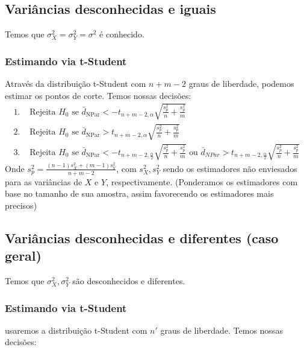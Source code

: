 \documentclass[
  letterpaper,
  DIV=11,
  numbers=noendperiod]{scrreprt}
\begin{document}
\subsection{Variâncias desconhecidas e
iguais}\label{variuxe2ncias-desconhecidas-e-iguais}

Temos que \(\sigma^2_{X}=\sigma^2_{Y}=\sigma^2\) é conhecido.

\subsubsection{Estimando via t-Student}\label{estimando-via-t-student}

Através da distribuição t-Student com \(n+m-2\) graus de liberdade,
podemos estimar os pontos de corte. Temos nossas decisões: \[
\begin{aligned}
1. &\text{ Rejeita $H_{0}$ se } \bar{d}_{\mathrm{NPar}} < -t_{n+m-2,\alpha} \sqrt{ \frac{s_{p}^2}{n} + \frac{s_{p}^2}{m} } \\
2. & \text{ Rejeita $H_{0}$ se } \bar{d}_{\mathrm{NPar}} > t_{n+m-2,\alpha} \sqrt{ \frac{s^2_{p}}{n} + \frac{s^2_{p}}{m} } \\
3. & \text{ Rejeita $H_{0}$ se } \bar{d}_{\mathrm{NPar}} < -t_{n+m-2,\frac{\alpha}{2}} \sqrt{ \frac{s^2_{p}}{n} +
\frac{s^2_{p}}{m} } \text{ ou } \bar{d}_{NPar} > t_{n+m-2, \frac{\alpha}{2}} \sqrt{ \frac{s^2_{p}}{n} + \frac{s^2_{p}}{m} }
\end{aligned}
\] Onde \(s^2_{p}= \frac{(n-1)s^2_{X}+(m-1)s^2_{Y}}{n+m-2}\), com
\(s^2_{X}, s^2_{Y}\) sendo os estimadores não enviesados para as
variâncias de \(X\) e \(Y\), respectivamente. (Ponderamos os estimadores
com base no tamanho de sua amostra, assim favorecendo os estimadores
mais precisos)

\subsection{Variâncias desconhecidas e diferentes (caso
geral)}\label{variuxe2ncias-desconhecidas-e-diferentes-caso-geral}

Temos que \(\sigma^2_{X},\sigma^2_{Y}\) são desconhecidos e diferentes.

\subsubsection{Estimando via t-Student}\label{estimando-via-t-student-1}

usaremos a distribuição t-Student com \(n'\) graus de liberdade. Temos
nossas decisões:
\end{document}
